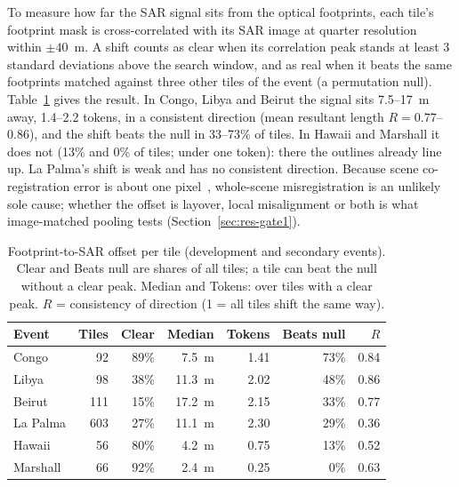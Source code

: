 \documentclass[journal]{IEEEtran}
\begin{document}
To measure how far the SAR signal sits from the optical footprints, each tile's footprint mask is cross-correlated with its SAR image at quarter resolution within $\pm40$~m. A shift counts as clear when its correlation peak stands at least 3 standard deviations above the search window, and as real when it beats the same footprints matched against three other tiles of the event (a permutation null). Table~\ref{tab:offsets} gives the result. In Congo, Libya and Beirut the signal sits 7.5--17~m away, 1.4--2.2 tokens, in a consistent direction (mean resultant length $R=0.77$--$0.86$), and the shift beats the null in 33--73\% of tiles. In Hawaii and Marshall it does not (13\% and 0\% of tiles; under one token): there the outlines already line up. La Palma's shift is weak and has no consistent direction. Because scene co-registration error is about one pixel~\cite{chen2025bright}, whole-scene misregistration is an unlikely sole cause; whether the offset is layover, local misalignment or both is what image-matched pooling tests (Section~\ref{sec:res-gate1}).

\begin{table}[t]
\centering
\caption{Footprint-to-SAR offset per tile (development and secondary events). Clear and Beats null are shares of all tiles; a tile can beat the null without a clear peak. Median and Tokens: over tiles with a clear peak. $R$ = consistency of direction (1 = all tiles shift the same way).}
\label{tab:offsets}
\footnotesize
\begin{tabular}{@{}lrrrrrr@{}}
\toprule
Event & Tiles & Clear & Median & Tokens & Beats null & $R$ \\
\midrule
Congo & 92 & 89\% & 7.5~m & 1.41 & 73\% & 0.84 \\
Libya & 98 & 38\% & 11.3~m & 2.02 & 48\% & 0.86 \\
Beirut & 111 & 15\% & 17.2~m & 2.15 & 33\% & 0.77 \\
La Palma & 603 & 27\% & 11.1~m & 2.30 & 29\% & 0.36 \\
Hawaii & 56 & 80\% & 4.2~m & 0.75 & 13\% & 0.52 \\
Marshall & 66 & 92\% & 2.4~m & 0.25 & 0\% & 0.63 \\
\bottomrule
\end{tabular}
\end{table}
\end{document}
